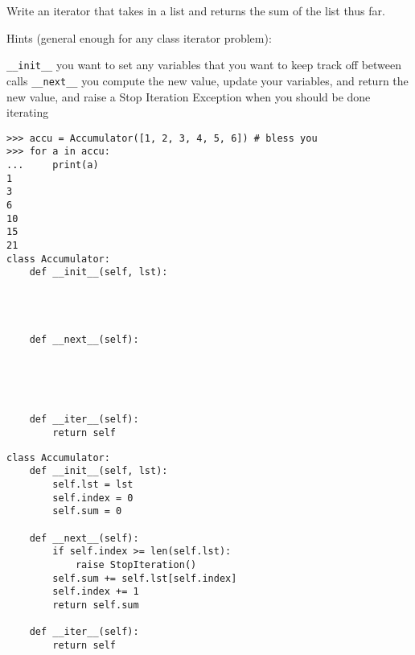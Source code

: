 \begin{blocksection}
\question Write an iterator that takes in a list and returns the sum of the list thus far.

Hints (general enough for any class iterator problem): 

\texttt{\_\_init\_\_} you want to set any variables that you want to keep track off between calls
\texttt{\_\_next\_\_} you compute the new value, update your variables, and return the new value, and raise a Stop Iteration Exception when you should be done iterating

\begin{lstlisting}
>>> accu = Accumulator([1, 2, 3, 4, 5, 6]) # bless you
>>> for a in accu:
...     print(a)
1
3
6
10
15
21
class Accumulator:
    def __init__(self, lst):




    def __next__(self):





    def __iter__(self):
    	return self
\end{lstlisting}

\begin{solution}[1.5in]
\begin{lstlisting}
class Accumulator:
    def __init__(self, lst):
        self.lst = lst
        self.index = 0
        self.sum = 0

    def __next__(self):
        if self.index >= len(self.lst):
            raise StopIteration()
        self.sum += self.lst[self.index]
        self.index += 1
        return self.sum

    def __iter__(self):
        return self
\end{lstlisting}
\end{solution}
\end{blocksection}

